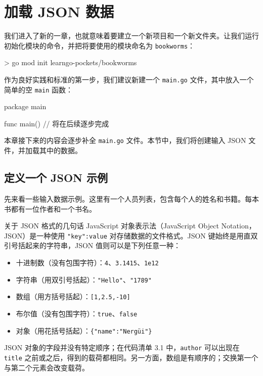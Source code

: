 \section{加载 JSON 数据}

我们进入了新的一章，也就意味着要建立一个新项目和一个新文件夹。让我们运行初始化模块的命令，并把将要使用的模块命名为 \texttt{bookworms}：

\begin{shellcode}[]
> go mod init learngo-pockets/bookworms
\end{shellcode}

作为良好实践和标准的第一步，我们建议新建一个 \texttt{main.go} 文件，其中放入一个简单的空 \texttt{main} 函数：

\begin{gocode}[]
package main

func main() {
    // 将在后续逐步完成
}
\end{gocode}

本章接下来的内容会逐步补全 \texttt{main.go} 文件。本节中，我们将创建输入 JSON 文件，并加载其中的数据。

\subsection{定义一个 JSON 示例}

先来看一些输入数据示例。这里有一个人员列表，包含每个人的姓名和书籍。每本书都有一位作者和一个书名。

\begin{infobox}{关于 JSON 格式的几句话}
JavaScript 对象表示法（JavaScript Object Notation，JSON）是一种使用 \texttt{"key":value} 对存储数据的文件格式。JSON 键始终是用直双引号括起来的字符串，JSON 值则可以是下列任意一种：

\begin{itemize}
  \item 十进制数（没有包围字符）：\texttt{4}、\texttt{3.1415}、\texttt{1e12}
  \item 字符串（用双引号括起）：\texttt{"Hello"}、\texttt{"1789"}
  \item 数组（用方括号括起）：\texttt{[1,2.5,-10]}
  \item 布尔值（没有包围字符）：\texttt{true}、\texttt{false}
  \item 对象（用花括号括起）：\texttt{\{"name":"Nergüi"\}}
\end{itemize}

JSON 对象的字段并没有特定顺序；在代码清单 3.1 中，\texttt{author} 可以出现在 \texttt{title} 之前或之后，得到的载荷都相同。另一方面，数组是有顺序的；交换第一个与第二个元素会改变载荷。
\end{infobox}


